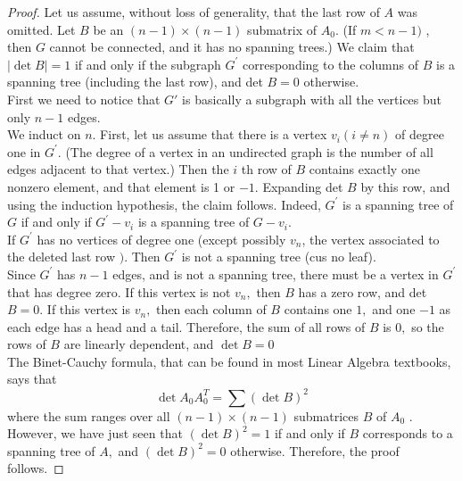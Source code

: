 \documentclass[12pt]{article}
\begin{document}
\begin{proof}
	Let us assume, without loss of generality, that the last row of $A$
	was omitted. Let $B$ be an $( n - 1 ) \times ( n - 1 )$ submatrix of $A _ { 0 } .$ (If $m < n - 1 )$ ,
	then $G$ cannot be connected, and it has no spanning trees.) We claim that
	$| \operatorname { det } B | = 1$ if and only if the subgraph $G ^ { \prime }$ corresponding to the columns of
	$B$ is a spanning tree (including the last row), and det $B = 0$ otherwise.\\
	\newline 
	First we need to notice that $G'$ is basically a subgraph with all the vertices but only $n - 1$ edges.\\
	\newline 
	We induct on $n .$ First, let us assume that there
	is a vertex $v _ { i } ( i \neq n )$ of degree one in $G ^ { \prime } .$ (The degree of a vertex in an
	undirected graph is the number of all edges adjacent to that vertex.) Then
	the $i$ th row of $B$ contains exactly one nonzero element, and that element is 1 or $- 1 .$ Expanding det $B$ by this row, and using the induction hypothesis,
	the claim follows. Indeed, $G ^ { \prime }$ is a spanning tree of $G$ if and only if $G ^ { \prime } - v _ { i }$
	is a spanning tree of $G - v _ { i } .$\\
	\newline
	If $G^{\prime}$ has no vertices of degree one (except possibly $v_{n}$,
	the vertex associated to the deleted last row $) .$ Then $G ^ { \prime }$ is not a spanning tree (cus no leaf). \\
	\newline
	Since $G ^ { \prime }$ has $n - 1$ edges, and is not a spanning tree, there
	must be a vertex in $G ^ { \prime }$ that has degree zero. If this vertex is not $v _ { n } ,$ then $B$
	has a zero row, and det $B = 0 .$ If this vertex is $v _ { n } ,$ then each column of $B$ contains one $1 ,$ and one $- 1$ as each edge has a head and a tail. Therefore,
	the sum of all rows of $B$ is $0 ,$ so the rows of $B$ are linearly dependent, and
	$\operatorname { det } B = 0$\\
	\newline 
	The Binet-Cauchy formula, that can be found in most Linear Algebra
	textbooks, says that
	\[ \operatorname { det } A _ { 0 } A _ { 0 } ^ { T } = \sum ( \operatorname { det } B ) ^ { 2 }\] where the sum ranges over all $( n - 1 ) \times ( n - 1 )$ submatrices $B$ of $A _ { 0 }$ .
	However, we have just seen that $( \operatorname { det } B ) ^ { 2 } = 1$ if and only if $B$ corresponds
	to a spanning tree of $A ,$ and $( \operatorname { det } B ) ^ { 2 } = 0$ otherwise. Therefore, the proof
	follows.
\end{proof}
\end{document}
